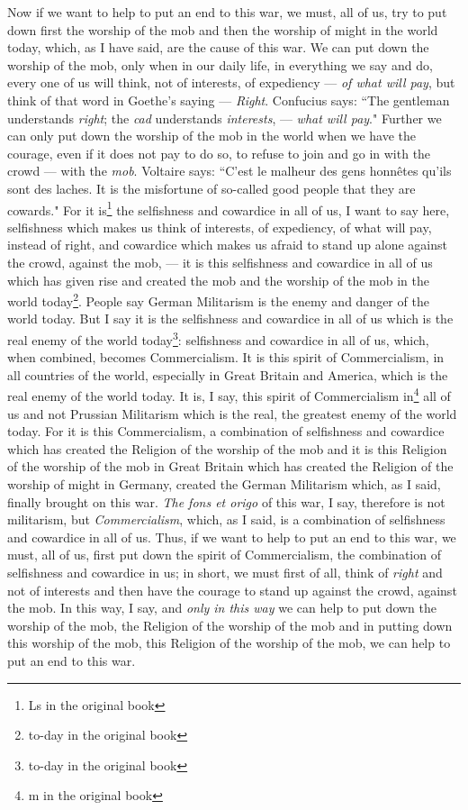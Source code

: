 Now if we want to help to put an end to this war, we must, all of us, try to put down first the worship of the mob and then the worship of might in the world today, which, as I have said, are the cause of this war.
We can put down the worship of the mob, only when in our daily life, in everything we say and do, every one of us will think, not of interests, of expediency --- \emph{of what will pay}, but think of that word in Goethe's saying --- \emph{Right}.
Confucius says: ``The gentleman understands \emph{right}; the \emph{cad} understands \emph{interests}, --- \emph{what will pay}."
Further we can only put down the worship of the mob in the world when we have the courage, even if it does not pay to do so, to refuse to join and go in with the crowd --- with the \emph{mob}.
Voltaire says: ``C'est le malheur des gens honn\^etes qu'ils sont des laches.
It is the misfortune of so-called good people that they are cowards."
For it is\footnote{Ls in the original book} the selfishness and cowardice in all of us, I want to say here, selfishness which makes us think of interests, of expediency, of what will pay, instead of right, and cowardice which makes us afraid to stand up alone against the crowd, against the mob, --- it is this selfishness and cowardice in all of us which has given rise and created the mob and the worship of the mob in the world today\footnote{to-day   in the original book}.
People say German Militarism is the enemy and danger of the world today.
But I say it is the selfishness and cowardice in all of us which is the real enemy of the world today\footnote{to-day in the original book}: selfishness and cowardice in all of us, which, when combined, becomes Commercialism.
It is this spirit of Commercialism, in all countries of the world, especially in Great Britain and America, which is the real enemy of the world today. 
It is, I say, this spirit of Commercialism in\footnote{m in the original book} all of us and not Prussian Militarism which is the real, the greatest enemy of the world today.
For it is this Commercialism, a combination of selfishness and cowardice which has created the Religion of the worship of the mob and it is this Religion of the worship of the mob in Great Britain which has created the Religion of the worship of might in Germany, created the German Militarism which, as I said, finally brought on this war.
\emph{The fons et origo} of this war, I say, therefore is not militarism, but \emph{Commercialism}, which, as I said, is a combination of selfishness and cowardice in all of us.
Thus, if we want to help to put an end to this war, we must, all of us, first put down the spirit of Commercialism, the combination of selfishness and cowardice in us; in short, we must first of all, think of \emph{right} and not of interests and then have the courage to stand up against the crowd, against the mob.
In this way, I say, and \emph{only in this way} we can help to put down the worship of the mob, the Religion of the worship of the mob and in putting down this worship of the mob, this Religion of the worship of the mob, we can help to put an end to this war.

